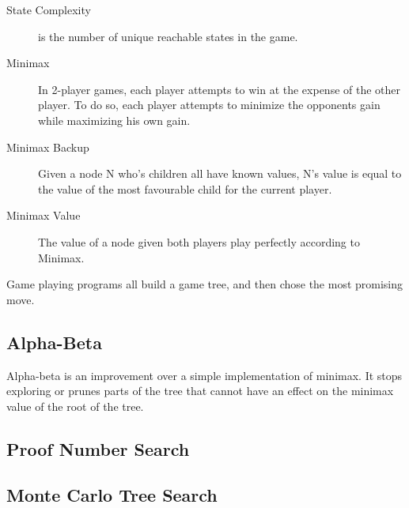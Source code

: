 \begin{description}
\item[State Complexity] is the number of unique reachable states in the game.
\item[Minimax] In 2-player games, each player attempts to win at the expense of the other player. To do so, each player attempts to minimize the opponents gain while maximizing his own gain.
\item[Minimax Backup] Given a node N who's children all have known values, N's value is equal to the value of the most favourable child for the current player.
\item[Minimax Value] The value of a node given both players play perfectly according to Minimax.
\end{description}

Game playing programs all build a game tree, and then chose the most promising move. 

\subsection{Alpha-Beta}

Alpha-beta is an improvement over a simple implementation of minimax. It stops exploring or prunes parts of the tree that cannot have an effect on the minimax value of the root of the tree.


\subsection{Proof Number Search}



\subsection{Monte Carlo Tree Search}

